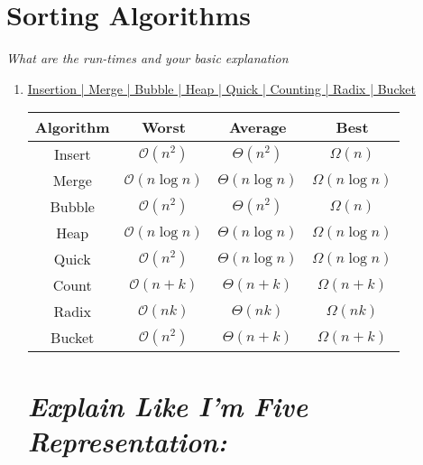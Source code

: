 \documentclass[10pt,letterpaper]{article}
\begin{document}
{
\newpage{}
\section*{Sorting Algorithms}
\emph{What are the run-times and your basic explanation}
\begin{enumerate}
	\item[]
	\begin{center}
		\underline{\underline{Insertion | Merge | Bubble | Heap | Quick | Counting | Radix | Bucket}}
	\end{center}

\begin{center}
	\vspace{2em}
	\renewcommand{\arraystretch}{1.7}
	\setlength{\tabcolsep}{20pt}
	\begin{tabular}{|c| |c| |c| |c|}
		\hline
		Algorithm	&	Worst	&	Average	&	Best 	\\[0.5ex] 
		\hline \hline
		Insert		&	$\mathcal{O}(n^{2})$		&	$\Theta(n^{2})$			&	$\Omega(n)$		        \\[0.5ex] 
		\hline
		Merge		&	$\mathcal{O}(n\log n)$		&	$\Theta(n\log n)$  		&   $\Omega(n\log n)$		\\[0.5ex] 
		\hline	
		Bubble		&   $\mathcal{O}(n^{2})$ 		&   $\Theta(n^{2})$			&	$\Omega(n)$		        \\[0.5ex] 
		\hline
		Heap		&	$\mathcal{O}(n \log n)$ 	&   $\Theta(n\log n)$       &   $\Omega(n\log n)$		\\[0.5ex] 
		\hline
		Quick		&	$\mathcal{O}(n^{2})$		&   $\Theta(n\log n)$	    &   $\Omega(n\log n)$		\\[0.5ex] 
		\hline
		Count		&	$\mathcal{O}(n+k)$			&   $\Theta(n +k)$		    &   $\Omega(n + k)$			\\[0.5ex] 
		\hline
		Radix		&	$\mathcal{O}(nk)$			&   $\Theta(nk)$			&   $\Omega(nk)$			\\[0.5ex] 
		\hline
		Bucket		&	$\mathcal{O}(n^{2})$		&   $\Theta(n+k)$		    &   $\Omega(n+k)$			\\[0.5ex] 
		\hline
	\end{tabular}
\end{center}	
	
	\section*{\textit{Explain Like I'm Five Representation:}}
	

\end{enumerate}}
\end{document}
